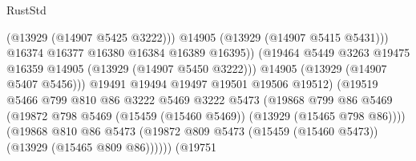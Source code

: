 \begin{lexlean}{RustStd}
\begin{coremodule}
                                                (@13929 (@14907 @5425 @3222)))
                                              @14905
                                              (@13929 (@14907 @5415 @5431)))
                                            @16374
                                            @16377
                                            @16380
                                            @16384
                                            @16389
                                            @16395))
                                        (@19464
                                          @5449
                                          @3263
                                          @19475
                                          @16359
                                          @14905
                                          (@13929 (@14907 @5450 @3222)))
                                        @14905
                                        (@13929 (@14907 @5407 @5456)))
                                      @19491
                                      @19494
                                      @19497
                                      @19501
                                      @19506
                                      @19512)
                                    (@19519
                                      @5466
                                      @799
                                      @810
                                      @86
                                      @3222
                                      @5469
                                      @3222
                                      @5473
                                      (@19868
                                        @799
                                        @86
                                        @5469
                                        (@19872
                                          @798
                                          @5469
                                          (@15459 (@15460 @5469))
                                          (@13929 (@15465 @798 @86))))
                                      (@19868
                                        @810
                                        @86
                                        @5473
                                        (@19872
                                          @809
                                          @5473
                                          (@15459 (@15460 @5473))
                                          (@13929 (@15465 @809 @86))))))
                                  (@19751

\end{coremodule}
\end{lexlean}
